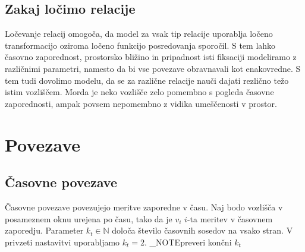 \subsection{Zakaj ločimo relacije}

Ločevanje relacij omogoča, da model za vsak tip relacije uporablja ločeno transformacijo oziroma ločeno funkcijo posredovanja sporočil.
S tem lahko časovno zaporednost, prostorsko bližino in pripadnost isti fiksaciji modeliramo z različnimi parametri, namesto da bi vse povezave obravnavali kot enakovredne. 
S tem tudi dovolimo modelu, da se za različne relacije nauči dajati rezlično težo istim vozliščem. Morda je neko vozlišče zelo pomembno s pogleda časovne zaporednosti, ampak povsem nepomembno z vidika umeščenosti v prostor.



\section{Povezave}

\subsection{Časovne povezave}
\label{subsec:casovne-povezave}

Časovne povezave povezujejo meritve zaporedne v času.
Naj bodo vozlišča v posameznem oknu urejena po času, tako da je $v_i$ $i$-ta meritev v časovnem zaporedju.
Parameter $k_t \in \mathbb{N}$ določa število časovnih sosedov na vsako stran.
V privzeti nastavitvi uporabljamo $k_t = 2$. \END_NOTE{preveri končni $k_t$}

